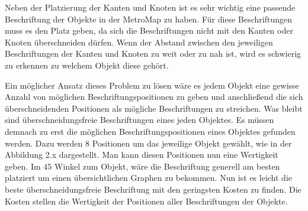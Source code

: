 Neben der Platzierung der Kanten und Knoten ist es sehr wichtig eine passende Beschriftung der Objekte in der MetroMap zu haben. Für diese Beschriftungen muss es den Platz geben, da sich die Beschriftungen nicht mit den Kanten oder Knoten überschneiden dürfen. Wenn der Abstand zwischen den jeweiligen Beschriftungen der Kanten und Knoten zu weit oder zu nah ist, wird es schwierig zu erkennen zu welchem Objekt diese gehört. 

Ein möglicher Ansatz dieses Problem zu lösen wäre es jedem Objekt eine gewisse Anzahl von möglichen Beschriftungspositionen zu geben und anschließend die sich überschneidenden Positionen als mögliche Beschriftungen zu streichen. Was bleibt sind überschneidungsfreie Beschriftungen eines jeden Objektes. Es müssen demnach zu erst die möglichen Beschriftungspositionen eines Objektes gefunden werden. Dazu werden 8 Positionen um das jeweilige Objekt gewählt, wie in der Abbildung 2.x dargestellt. Man kann diesen Positionen nun eine Wertigkeit geben. Im $45$ Winkel zum Objekt, wäre die Beschriftung generell am besten platziert um einen übersichtlichen Graphen zu bekommen. Nun ist es leicht die beste überschneidungsfreie Beschriftung mit den geringsten Kosten zu finden. Die Kosten stellen die Wertigkeit der Positionen aller Beschriftungen der Objekte.  